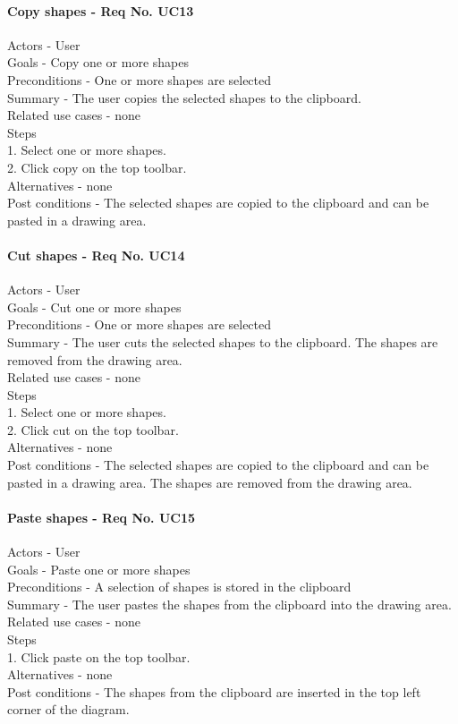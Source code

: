 \documentclass[twoside,letterpaper]{article}
\begin{document}
{\paragraph{Copy shapes - Req No. UC13\newline}
Actors - User\\
Goals - Copy one or more shapes\\
Preconditions - One or more shapes are selected\\
Summary - The user copies the selected shapes to the clipboard.\\
Related use cases - none\\
Steps\\
1. Select one or more shapes.\\
2. Click copy on the top toolbar.\\
Alternatives - none\\
Post conditions - The selected shapes are copied to the clipboard and can be pasted in a drawing area.\\

\paragraph{Cut shapes - Req No. UC14\newline}
Actors - User\\
Goals - Cut one or more shapes\\
Preconditions - One or more shapes are selected\\
Summary - The user cuts the selected shapes to the clipboard. The shapes are removed from the drawing area.\\
Related use cases - none\\
Steps\\
1. Select one or more shapes.\\
2. Click cut on the top toolbar.\\
Alternatives - none\\
Post conditions - The selected shapes are copied to the clipboard and can be pasted in a drawing area. The shapes are removed from the drawing area.\\

\paragraph{Paste shapes - Req No. UC15\newline}
Actors - User\\
Goals - Paste one or more shapes\\
Preconditions - A selection of shapes is stored in the clipboard\\
Summary - The user pastes the shapes from the clipboard into the drawing area.\\
Related use cases - none\\
Steps\\
1. Click paste on the top toolbar.\\
Alternatives - none\\
Post conditions - The shapes from the clipboard are inserted in the top left corner of the diagram.\\

}
\end{document}
